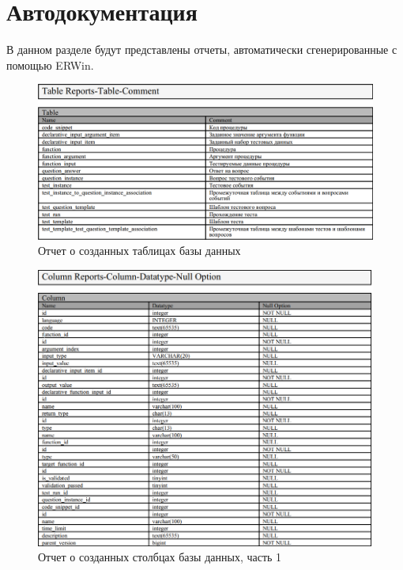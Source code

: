 \documentclass{article}
\begin{document}
\section{Автодокументация}
В данном разделе будут представлены отчеты, автоматически сгенерированные
с помощью ERWin.

\begin{figure}[H]
	\includegraphics[width=\textwidth, center]{TableDefinitions.png}
	\caption{Отчет о созданных таблицах базы данных}
\end{figure}

\begin{figure}[H]
	\includegraphics[width=\textwidth, center]{ColumnReport_Part1.png}
	\caption{Отчет о созданных столбцах базы данных, часть 1}	
\end{figure}
\end{document}
